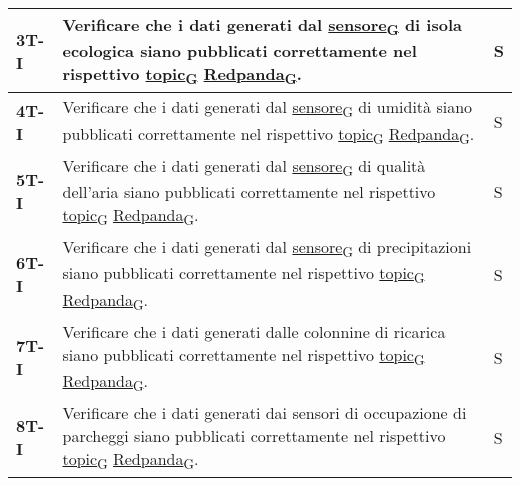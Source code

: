 \begin{longtable}{|>{\raggedright\arraybackslash}m{}|>{\raggedright\arraybackslash}m{}|>{\raggedright\arraybackslash}m{}|}
	\hline
	\textbf{3T-I}   & Verificare che i dati generati dal \href{https://7last.github.io/docs/rtb/documentazione-interna/glossario\#sensore}{sensore\textsubscript{G}} di isola ecologica siano pubblicati correttamente nel rispettivo \href{https://7last.github.io/docs/rtb/documentazione-interna/glossario\#topic}{topic\textsubscript{G}} \href{https://7last.github.io/docs/pb/documentazione-interna/glossario\#redpanda}{Redpanda\textsubscript{G}}.   & S              \\
	\hline
	\textbf{4T-I}   & Verificare che i dati generati dal \href{https://7last.github.io/docs/rtb/documentazione-interna/glossario\#sensore}{sensore\textsubscript{G}} di umidità siano pubblicati correttamente nel rispettivo \href{https://7last.github.io/docs/rtb/documentazione-interna/glossario\#topic}{topic\textsubscript{G}} \href{https://7last.github.io/docs/pb/documentazione-interna/glossario\#redpanda}{Redpanda\textsubscript{G}}.           & S              \\
	\hline
	\textbf{5T-I}   & Verificare che i dati generati dal \href{https://7last.github.io/docs/rtb/documentazione-interna/glossario\#sensore}{sensore\textsubscript{G}} di qualità dell'aria siano pubblicati correttamente nel rispettivo \href{https://7last.github.io/docs/rtb/documentazione-interna/glossario\#topic}{topic\textsubscript{G}} \href{https://7last.github.io/docs/pb/documentazione-interna/glossario\#redpanda}{Redpanda\textsubscript{G}}. & S              \\
	\hline
	\textbf{6T-I}   & Verificare che i dati generati dal \href{https://7last.github.io/docs/rtb/documentazione-interna/glossario\#sensore}{sensore\textsubscript{G}} di precipitazioni siano pubblicati correttamente nel rispettivo \href{https://7last.github.io/docs/rtb/documentazione-interna/glossario\#topic}{topic\textsubscript{G}} \href{https://7last.github.io/docs/pb/documentazione-interna/glossario\#redpanda}{Redpanda\textsubscript{G}}.    & S              \\
	\hline
	\textbf{7T-I}   & Verificare che i dati generati dalle colonnine di ricarica siano pubblicati correttamente nel rispettivo \href{https://7last.github.io/docs/rtb/documentazione-interna/glossario\#topic}{topic\textsubscript{G}} \href{https://7last.github.io/docs/pb/documentazione-interna/glossario\#redpanda}{Redpanda\textsubscript{G}}.                                                                                                          & S              \\
	\hline
	\textbf{8T-I}   & Verificare che i dati generati dai sensori di occupazione di parcheggi siano pubblicati correttamente nel rispettivo \href{https://7last.github.io/docs/rtb/documentazione-interna/glossario\#topic}{topic\textsubscript{G}} \href{https://7last.github.io/docs/pb/documentazione-interna/glossario\#redpanda}{Redpanda\textsubscript{G}}.                                                                                              & S              \\

\end{longtable}
